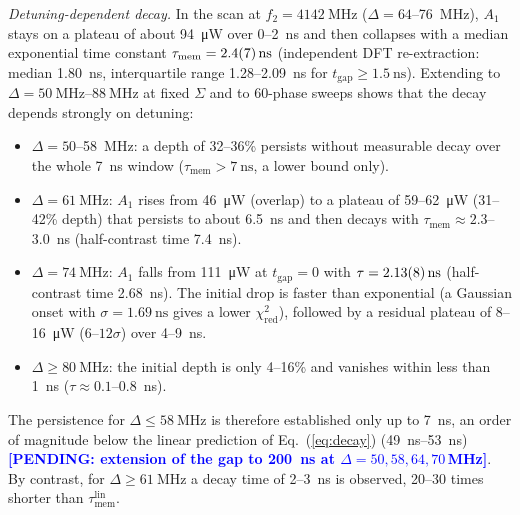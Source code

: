 \documentclass[aps,prb,reprint,superscriptaddress,floatfix]{revtex4-2}
\newcommand{\pend}[1]{\textcolor{blue}{\textbf{[PENDING: #1]}}}
\newcommand{\pend}[1]{}
\newcommand{\tgap}{t_{\mathrm{gap}}}
\begin{document}
\emph{Detuning-dependent decay.} In the scan at $f_2=\SI{4142}{\mega\hertz}$ ($\Delta=64$--\SI{76}{\mega\hertz}), $A_1$ stays on a plateau of about \SI{94}{\micro\watt} over $0$--\SI{2}{\nano\second} and then collapses with a median exponential time constant $\tau_{\mathrm{mem}}=\SI{2.4+-0.7}{\nano\second}$ (independent DFT re-extraction: median \SI{1.80}{\nano\second}, interquartile range 1.28--\SI{2.09}{\nano\second} for $\tgap\ge\SI{1.5}{\nano\second}$). Extending to $\Delta=\SIrange{50}{88}{\mega\hertz}$ at fixed $\Sigma$ and to 60-phase sweeps shows that the decay depends strongly on detuning:
\begin{itemize}
\item $\Delta=50$--\SI{58}{\mega\hertz}: a depth of 32--36\% persists without measurable decay over the whole \SI{7}{\nano\second} window ($\tau_{\mathrm{mem}}>\SI{7}{\nano\second}$, a lower bound only).
\item $\Delta=\SI{61}{\mega\hertz}$: $A_1$ rises from \SI{46}{\micro\watt} (overlap) to a plateau of 59--\SI{62}{\micro\watt} (31--42\% depth) that persists to about \SI{6.5}{\nano\second} and then decays with $\tau_{\mathrm{mem}}\approx2.3$--\SI{3.0}{\nano\second} (half-contrast time \SI{7.4}{\nano\second}).
\item $\Delta=\SI{74}{\mega\hertz}$: $A_1$ falls from \SI{111}{\micro\watt} at $\tgap=0$ with $\tau=\SI{2.13+-0.08}{\nano\second}$ (half-contrast time \SI{2.68}{\nano\second}). The initial drop is faster than exponential (a Gaussian onset with $\sigma=\SI{1.69}{\nano\second}$ gives a lower $\chi^2_{\mathrm{red}}$), followed by a residual plateau of 8--\SI{16}{\micro\watt} ($6$--$12\sigma$) over 4--\SI{9}{\nano\second}.
\item $\Delta\ge\SI{80}{\mega\hertz}$: the initial depth is only 4--16\% and vanishes within less than \SI{1}{\nano\second} ($\tau\approx0.1$--\SI{0.8}{\nano\second}).
\end{itemize}
The persistence for $\Delta\le\SI{58}{\mega\hertz}$ is therefore established only up to \SI{7}{\nano\second}, an order of magnitude below the linear prediction of Eq.~(\ref{eq:decay}) (\SIrange{49}{53}{\nano\second}) \pend{extension of the gap to \SI{200}{\nano\second} at $\Delta=50,58,64,70$\,MHz}. By contrast, for $\Delta\ge\SI{61}{\mega\hertz}$ a decay time of 2--\SI{3}{\nano\second} is observed, 20--30 times shorter than $\tau_{\mathrm{mem}}^{\mathrm{lin}}$.
\end{document}
